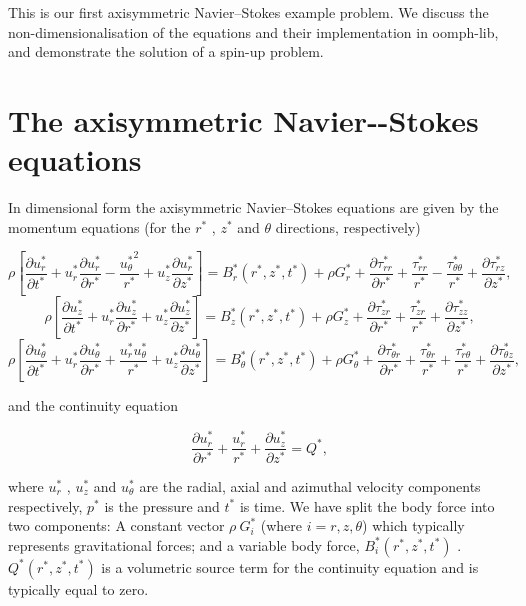 This is our first axisymmetric Navier--Stokes example problem. We discuss the non-\/dimensionalisation of the equations and their implementation in {\ttfamily oomph-\/lib}, and demonstrate the solution of a spin-\/up problem.



 

\hypertarget{index_equations}{}\section{The axisymmetric Navier-\/-\/\+Stokes equations}\label{index_equations}
In dimensional form the axisymmetric Navier--Stokes equations are given by the momentum equations (for the $ r^* $ , $ z^* $ and $ \theta $ directions, respectively) \begin{center} \[ \rho \left[ \frac{\partial u_r^*}{\partial t^*} + {u_r^*}\frac{\partial u_r^*}{\partial r^*} - \frac{{u_{\theta}^*}^2}{r^*} + {u_z^*}\frac{\partial u_r^*}{\partial z^*} \right] = B_r^*\left(r^*,z^*,t^*\right) + \rho G_r^* + \frac{\partial \tau_{rr}^*}{\partial r^*} + \frac{\tau_{rr}^*}{r^*} - \frac{\tau_{\theta\theta}^*}{r^*} + \frac{\partial\tau_{rz}^*}{\partial z^*}, \] \[ \rho \left[ \frac{\partial u_z^*}{\partial t^*} + {u_r^*}\frac{\partial u_z^*}{\partial r^*} + {u_z^*}\frac{\partial u_z^*}{\partial z^*} \right] = B_z^*\left(r^*,z^*,t^*\right) + \rho G_z^* + \frac{\partial \tau_{zr}^*}{\partial r^*} + \frac{\tau_{zr}^*}{r^*} + \frac{\partial\tau_{zz}^*}{\partial z^*}, \] \[ \rho \left[ \frac{\partial u_{\theta}^*}{\partial t^*} + {u_r^*}\frac{\partial u_{\theta}^*}{\partial r^*} + \frac{u_r^* u_{\theta}^*}{r^*} + u_z^* \frac{\partial u_{\theta}^*}{\partial z^*} \right] = B_\theta^*\left(r^*,z^*,t^*\right) + \rho G_\theta^* + \frac{\partial \tau_{\theta r}^*}{\partial r^*} + \frac{\tau_{\theta r}^*}{r^*} + \frac{\tau_{r\theta}^*}{r^*} + \frac{\partial\tau_{\theta z}^*}{\partial z^*}, \] \end{center} 

and the continuity equation

\begin{center} \[ \frac{\partial u_r^*}{\partial r^*} + \frac{u_r^*}{r^*} + \frac{\partial u_z^*}{\partial z^*} = Q^*, \] \end{center} 

where $ u_r^* $ , $ u_z^* $ and $ u_{\theta}^* $ are the radial, axial and azimuthal velocity components respectively, $ p^* $ is the pressure and $ t^* $ is time. We have split the body force into two components\+: A constant vector $ \rho \ G_i^* $ (where $ i = r, z, \theta $) which typically represents gravitational forces; and a variable body force, $ B_i^*(r^*,z^*,t^*) $ . $ Q^*(r^*,z^*,t^*) $ is a volumetric source term for the continuity equation and is typically equal to zero.

